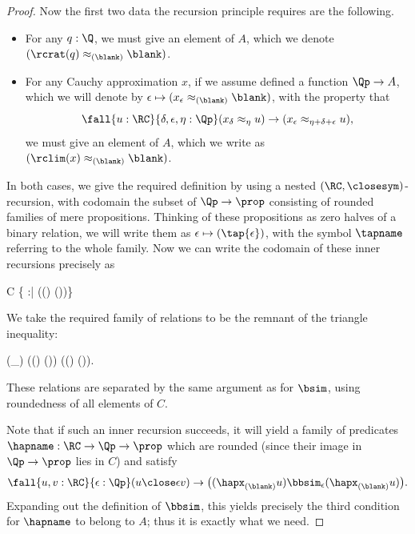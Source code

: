 \begin{proof}
  Now the first two data the recursion principle requires are the following.
  \begin{itemize}
  \item For any $q:\Q$, we must give an element of $A$, which we denote $(\rcrat(q)\approx_{(\blank)} \blank)$.
  \item For any Cauchy approximation $x$, if we assume defined a function $\Qp \to A$, which we will denote by $\epsilon \mapsto (x_\epsilon \approx_{(\blank)} \blank)$, with the property that
    \begin{equation}
      \fall{u:\RC}{\delta,\epsilon,\eta:\Qp} (x_\delta \approx_\eta u) \to (x_\epsilon \approx_{\eta+\delta+\epsilon} u),\label{eq:appxrec2}
    \end{equation}
    we must give an element of $A$, which we write as $(\rclim(x)\approx_{(\blank)} \blank)$.
  \end{itemize}
  In both cases, we give the required definition by using a nested $(\RC,\closesym)$-recursion, with codomain the subset of $\Qp\to\prop$ consisting of rounded families of mere propositions.
  Thinking of these propositions as zero halves of a binary relation, we will write them as $\epsilon \mapsto (\tap{\epsilon})$, with the symbol $\tapname$ referring to the whole family.
  Now we can write the codomain of these inner recursions precisely as
  \begin{narrowmultline*}
    C 
    \bigg\{ \tapname :\Qp\to\prop \;\;\Big|\;\; \narrowbreak
    \fall{\epsilon:\Qp} \Big((\tap\epsilon) \Leftrightarrow \exis{\theta:\Qp} (\tap{\epsilon-\theta})\Big)\bigg\}
  \end{narrowmultline*}
  We take the required family of relations to be the remnant of the triangle inequality:
  \begin{narrowmultline*}
    (\tapname \bbsim_\epsilon \tapbname) 
    \fall{\eta:\Qp} ((\tap\eta) \to (\tapb{\epsilon+\eta})) \land
    \narrowbreak
    ((\tapb\eta) \to (\tap{\epsilon+\eta})).
  \end{narrowmultline*}
  These relations are separated by the same argument as for $\bsim$, using roundedness of all elements of $C$.

  Note that if such an inner recursion succeeds, it will yield a family of predicates $\hapname : \RC\to\Qp\to \prop$ which are rounded
(since their image in $\Qp\to\prop$ lies in $C$) and satisfy
  \[ \fall{u,v:\RC}{\epsilon:\Qp} (u\close\epsilon v) \to \big((\hapx_{(\blank)} u) \bbsim_\epsilon (\hapx_{(\blank)} u)\big). \]
  Expanding out the definition of $\bbsim$, this yields precisely the third condition for $\hapname$ to belong to $A$; thus it is exactly what we need.


\end{proof}
